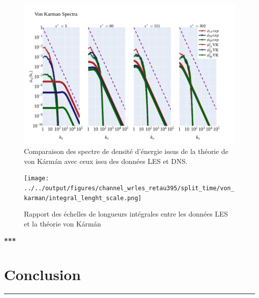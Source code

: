 \documentclass[12pt]{article}
\theoremstyle{plain}
\theoremstyle{remark}
\begin{document}
\begin{figure}[H]
	\begin{center}
		\includegraphics[width=0.9\linewidth]{../../output/figures/channel_wrles_retau395/split_time/von_karman/von_karman_spectra_.png}
		\caption{Comparaison des spectre de densité d'énergie issus de la théorie de von Kármán avec ceux issu des données LES et DNS.}
		\label{fig:vk_spectra}
	\end{center}
\end{figure}


\begin{figure}[H]
	\begin{center}
		\texttt{[image: ../../output/figures/channel\_wrles\_retau395/split\_time/von\_karman/integral\_lenght\_scale.png]}
		\caption{Rapport des échelles de longueurs intégrales entre les données LES et la théorie von Kármán}
		\label{fig:vk_integral_scale}
	\end{center}
\end{figure}
	


\begin{center}
	\large \bf{***}
\end{center}

\vspace{0.3cm}
\section{Conclusion}
\noindent\rule{\linewidth}{2pt}
\vspace{0.1cm}
\end{document}

